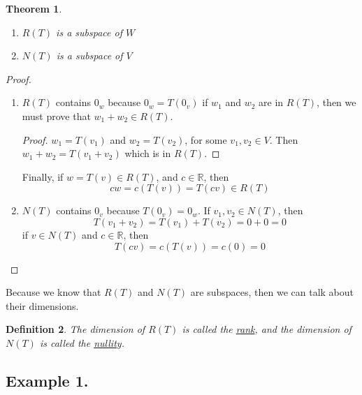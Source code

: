 \documentclass{article}
\newtheorem{theorem}{Theorem}[section]
\newtheorem{definition}[theorem]{Definition}
\newtheorem{one minute paper}[theorem]{One Minute Paper}
\begin{document}
\begin{theorem}
    \begin{enumerate}
        \item $R(T)$ is a subspace of $W$
        \item $N(T)$ is a subspace of $V$
    \end{enumerate}
\end{theorem}

\begin{proof}
    \begin{enumerate}
        \item $R(T)$ contains $0_w$ because $0_w = T(0_v)$
        if $w_1$ and $w_2$ are in $R(T)$, then we must prove that $w_1 + w_2 \in R(T)$.
        \begin{proof}
            $w_1 = T(v_1)$ and $w_2 = T(v_2)$, for some $v_1, v_2 \in V$. Then $w_1 + w_2 = T(v_1 + v_2)$ which is in $R(T)$. 
        \end{proof}
        Finally, if $w = T(v) \in R(T)$, and $c \in \mathbb{R}$, then 
        \begin{equation}
            cw = c(T(v)) = T(cv) \in R(T)
        \end{equation}

        \item $N(T)$ contains $0_v$ because $T(0_v) = 0_w$. 
        If $v_1, v_2 \in N(T)$, then 
        \begin{equation}
            T(v_1 + v_2) = T(v_1) + T(v_2) = 0 + 0 = 0
        \end{equation}
        if $v \in N(T)$ and $c \in \mathbb{R}$, then 
        \begin{equation}
            T(cv) = c(T(v)) = c(0) = 0
        \end{equation}
    \end{enumerate}
\end{proof}

Because we know that $R(T)$ and $N(T)$ are subspaces, then we can talk about their dimensions. 

\begin{definition}
    The dimension of $R(T)$ is called the \underline{rank}, and the dimension of $N(T)$ is called the \underline{nullity}. 
\end{definition}

\subsection*{Example 1.}
\end{document}
